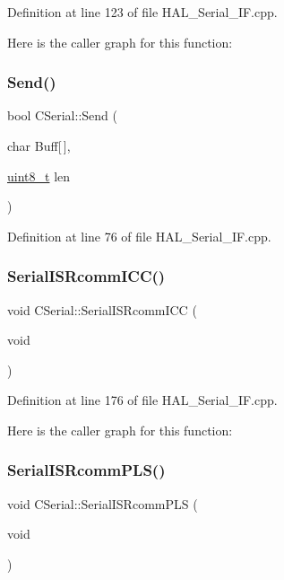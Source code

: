 Definition at line 123 of file H\+A\+L\+\_\+\+Serial\+\_\+\+I\+F.\+cpp.

Here is the caller graph for this function\+:
\mbox{\label{class_c_serial_ae5bec6d6a1c75839ae02cf0069d1f08e}} 
\subsubsection{\texorpdfstring{Send()}{Send()}}
{\footnotesize\ttfamily bool C\+Serial\+::\+Send (\begin{DoxyParamCaption}\item[{char}]{Buff\mbox{[}$\,$\mbox{]},  }\item[{\mbox{\hyperlink{_a_d_a_s___types_8h_aba7bc1797add20fe3efdf37ced1182c5}{uint8\+\_\+t}}}]{len }\end{DoxyParamCaption})}



Definition at line 76 of file H\+A\+L\+\_\+\+Serial\+\_\+\+I\+F.\+cpp.

\mbox{\label{class_c_serial_a974812db5ced18cb9a6a73dc9034e7c8}} 
\subsubsection{\texorpdfstring{SerialISRcommICC()}{SerialISRcommICC()}}
{\footnotesize\ttfamily void C\+Serial\+::\+Serial\+I\+S\+Rcomm\+I\+CC (\begin{DoxyParamCaption}\item[{void}]{ }\end{DoxyParamCaption})}



Definition at line 176 of file H\+A\+L\+\_\+\+Serial\+\_\+\+I\+F.\+cpp.

Here is the caller graph for this function\+:
\mbox{\label{class_c_serial_a707841754d94fc1ab6679f52bf413d85}} 
\subsubsection{\texorpdfstring{SerialISRcommPLS()}{SerialISRcommPLS()}}
{\footnotesize\ttfamily void C\+Serial\+::\+Serial\+I\+S\+Rcomm\+P\+LS (\begin{DoxyParamCaption}\item[{void}]{ }\end{DoxyParamCaption})}



